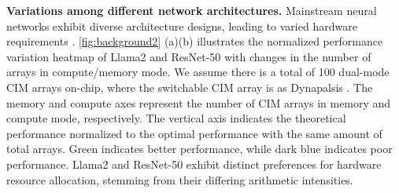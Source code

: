 \noindent
\textbf{Variations among different network architectures.}
Mainstream neural networks exhibit diverse architecture designs, leading to varied hardware requirements \cite{he2016deep,simonyan2014very,dosovitskiy2020image,devlin2018bert,redmon2016you,touvron2023llama,nerf,rombach2022high}. 
\fig \ref{fig:background2} (a)(b) illustrates the normalized performance variation heatmap of Llama2 \cite{touvron2023llama} and ResNet-50 \cite{he2016deep} with changes in the number of arrays in compute/memory mode. We assume there is a total of 100 dual-mode CIM arrays on-chip, where the switchable CIM array is as Dynapalsis \cite{kim202316}. 
The memory and compute axes represent the number of CIM arrays in memory and compute mode, respectively.
The vertical axis indicates the theoretical performance normalized to the optimal performance with the same amount of total arrays.
Green indicates better performance, while dark blue indicates poor performance.
Llama2 and ResNet-50 exhibit distinct preferences for hardware resource allocation, stemming from their differing arithmetic intensities. 
